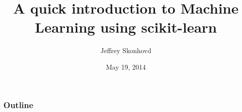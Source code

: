 \documentclass[t]{beamer}
\title{A quick introduction to Machine Learning using scikit-learn}
\author{Jeffrey Skonhovd}
\institute{Georgia Institute of Technology}
\date{May 19, 2014}
\begin{document}
\begin{frame}
\titlepage
\end{frame}

\begin{frame}
\frametitle{Outline}
\tableofcontents
\end{frame}


\end{document}
